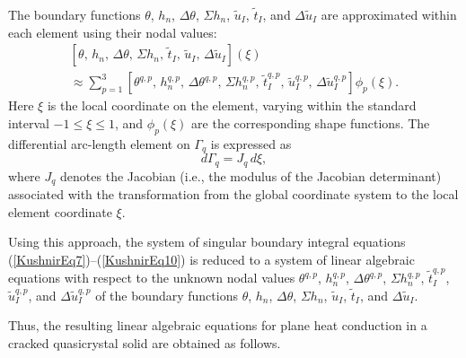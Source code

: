 The boundary functions $\theta$, $h_{n}$, $\Delta\theta$, $\Sigma h_{n}$,
$\tilde{u}_{I}$, $\tilde{t}_{I}$, and $\Delta\tilde{u}_{I}$ are
approximated within each element using their nodal values:
\begin{multline}
	\left[
	\theta,\, h_{n},\, \Delta\theta,\, \Sigma h_{n},\,
	\tilde{t}_{I},\, \tilde{u}_{I},\, \Delta\tilde{u}_{I}
	\right](\xi)
	\\
	\approx
	\sum_{p=1}^{3}
	\left[
	\theta^{q,p},\, h_{n}^{q,p},\, \Delta\theta^{q,p},\, \Sigma h_{n}^{q,p},\,
	\tilde{t}_{I}^{q,p},\, \tilde{u}_{I}^{q,p},\, \Delta\tilde{u}_{I}^{q,p}
	\right]
	\phi_{p}(\xi).
	\label{KushnirEq16}
\end{multline}
%
Here $\xi$ is the local coordinate on the element, varying within
the standard interval $-1 \leq \xi \leq 1$, and $\phi_{p}(\xi)$ are
the corresponding shape functions. The differential arc-length element
on $\Gamma_{q}$ is expressed as
\[
d\Gamma_{q} = J_{q}\, d\xi,
\]
where $J_{q}$ denotes the Jacobian (i.e., the modulus of the Jacobian
determinant) associated with the transformation from the global
coordinate system to the local element coordinate $\xi$.

Using this approach, the system of singular boundary integral equations
(\ref{KushnirEq7})--(\ref{KushnirEq10}) is reduced to a system of
linear algebraic equations with respect to the unknown nodal values
$\theta^{q,p}$, $h_{n}^{q,p}$, $\Delta\theta^{q,p}$, $\Sigma h_{n}^{q,p}$,
$\tilde{t}_{I}^{q,p}$, $\tilde{u}_{I}^{q,p}$, and $\Delta\tilde{u}_{I}^{q,p}$
of the boundary functions $\theta$, $h_{n}$, $\Delta\theta$, $\Sigma h_{n}$,
$\tilde{u}_{I}$, $\tilde{t}_{I}$, and $\Delta\tilde{u}_{I}$.

Thus, the resulting linear algebraic equations for plane heat conduction
in a cracked quasicrystal solid are obtained as follows.

